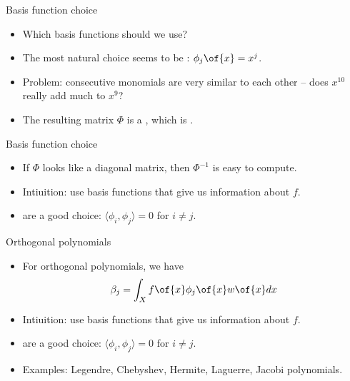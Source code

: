 \documentclass[11pt,xcolor={dvipsnames},aspectratio=159,hyperref={pdftex,pdfpagemode=UseNone,hidelinks,pdfdisplaydoctitle=true},usepdftitle=false]{beamer}
\begin{document}
\begin{frame}{Basis function choice} 
    \begin{itemize}
        \item Which basis functions should we use? 
        \item The most natural choice seems to be : $\phi_j\of{x} = x^j$.
        \item Problem: consecutive monomials are very similar to each other -- does $x^{10}$ really add much to $x^{9}$?
        \item The resulting matrix $\Phi$ is a , which is .
    \end{itemize}
\end{frame}

\begin{frame}{Basis function choice} 
    \begin{itemize}
        \item If $\Phi$ looks like a diagonal matrix, then $\Phi^{-1}$ is easy to compute. 
        \item Intiuition: use basis functions that give us  information about $f$.
        \item {} are a good choice: $\langle \phi_i, \phi_j \rangle = 0$ for $i\neq j$.
    \end{itemize}
\end{frame}

\begin{frame}{Orthogonal polynomials}
    \begin{itemize}
        \item For orthogonal polynomials, we have 
        \begin{align*}
            \beta_j = \int_{X} f\of{x} \phi_j\of{x} w\of{x} dx
        \end{align*}
        \item Intiuition: use basis functions that give us  information about $f$.
        \item {} are a good choice: $\langle \phi_i, \phi_j \rangle = 0$ for $i\neq j$.
        \item Examples: Legendre, Chebyshev, Hermite, Laguerre, Jacobi polynomials.
    \end{itemize}
\end{frame}
\end{document}
